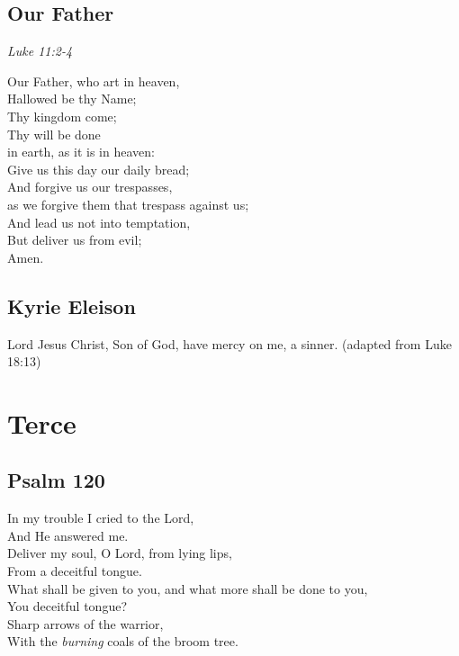 \documentclass[14pt]{extbook}
\begin{document}
\newpage
\hypertarget{our-father}{%
\subsection{Our Father}\label{our-father}}
\emph{Luke 11:2-4}

    Our Father, who art in heaven,\\
    Hallowed be thy Name;\\
    Thy kingdom come;\\
    Thy will be done\\
    in earth, as it is in heaven:\\
    Give us this day our daily bread;\\
    And forgive us our trespasses,\\
    as we forgive them that trespass against us;\\
    And lead us not into temptation,\\
    But deliver us from evil;\\
    Amen.

\hypertarget{kyrie-eleison}{%
\subsection{Kyrie Eleison}\label{kyrie-eleison}}
Lord Jesus Christ, Son of God, have mercy on me, a sinner. (adapted from Luke 18:13)

\newpage
\hypertarget{terce}{%
\section{Terce}\label{terce}}

\hypertarget{psalm-120}{%
\subsection{Psalm 120}\label{psalm-120}}

In my trouble I cried to the Lord,\\
And He answered me.\\
Deliver my soul, O Lord, from lying lips,\\
From a deceitful tongue.\\
What shall be given to you, and what more shall be done to you,\\
You deceitful tongue?\\
Sharp arrows of the warrior,\\
With the \emph{burning} coals of the broom tree.
\end{document}
